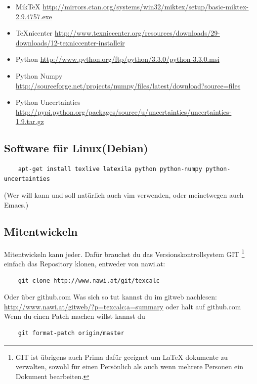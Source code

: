 \documentclass[a4paper]{article}
\begin{document}
\begin{itemize}
	\item MikTeX \url{http://mirrors.ctan.org/systems/win32/miktex/setup/basic-miktex-2.9.4757.exe}
	\item TeXnicenter \url{http://www.texniccenter.org/resources/downloads/29-downloads/12-texniccenter-installeir}
	\item Python \url{http://www.python.org/ftp/python/3.3.0/python-3.3.0.msi}
	\item Python Numpy \url{http://sourceforge.net/projects/numpy/files/latest/download?source=files}
	\item Python Uncertainties \url{http://pypi.python.org/packages/source/u/uncertainties/uncertainties-1.9.tar.gz}
\end{itemize}

\subsection{Software für Linux(Debian)}

\begin{verbatim}
	apt-get install texlive latexila python python-numpy python-uncertainties
\end{verbatim}

(Wer will kann und soll natürlich auch vim verwenden, oder meinetwegen auch Emacs.)

\subsection{Mitentwickeln}

Mitentwickeln kann jeder. Dafür brauchst du das Versionskontrollsystem GIT
\footnote{GIT ist übrigens auch Prima dafür geeignet um LaTeX dokumente zu verwalten, 
sowohl für einen Persönlich als auch wenn mehrere Personen ein Dokument bearbeiten. } 
einfach das Repository klonen, entweder von nawi.at: 

\begin{verbatim}
	git clone http://www.nawi.at/git/texcalc
\end{verbatim}

Oder über github.com Was sich so tut kannst du im gitweb nachlesen: 
\url{http://www.nawi.at/gitweb/?p=texcalc;a=summary} oder halt auf github.com\\

Wenn du einen Patch machen willst kannst du 

\begin{verbatim}
	git format-patch origin/master
\end{verbatim}
\end{document}
